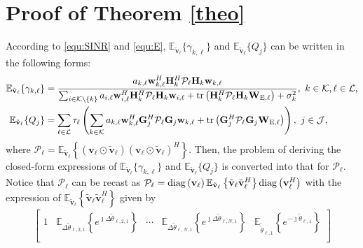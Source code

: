 \documentclass[12pt,draftclsnofoot, onecolumn]{IEEEtran}
\theoremstyle{plain}
\begin{document}
\begin{sloppypar}
\section{Proof of Theorem \ref{theo}} \label{Appen_A}
According to \eqref{equ:SINR} and \eqref{equ:E}, $\mathbb E_{\tilde{\mathbf v}_\ell}\{ \gamma_{k,\ell}\}$ and $\mathbb E_{\tilde{\mathbf v}_\ell}\{ Q_j\}$ can be written in the following forms: 
{\addtolength{\jot}{5pt}
	\begin{align}
	\mathbb E_{\tilde{\mathbf v}_\ell}\{ \gamma_{k,\ell}\} & = \frac{a_{k,\ell}\mathbf w_{k,\ell}^H\mathbf H_k^H\mathcal P_\ell\mathbf H_k\mathbf w_{k,\ell}}{\sum_{i\in \mathcal K\backslash\{k\}}a_{i,\ell}\mathbf w_{i,\ell}^H\mathbf H_k^H\mathcal P_\ell\mathbf H_k\mathbf w_{i,\ell} + {\rm tr}\left(\mathbf H_k^H\mathcal P_\ell\mathbf H_k\mathbf W_{\mathrm E,\ell}\right)+ \sigma_k^2}, \  k\in\mathcal K, \ell\in\mathcal L, \label{expecta_SINR_orig}\\ 
	\mathbb E_{\tilde{\mathbf v}_\ell}\{ Q_j\} & = \sum_{\ell\in\mathcal L}\tau_\ell\left(\sum_{k\in\mathcal K}a_{k,\ell}\mathbf w_{k,\ell}^H\mathbf G_j^H\mathcal P_\ell\mathbf G_j\mathbf w_{k,\ell} + {\rm tr}\left(\mathbf G_j^H\mathcal P_\ell\mathbf G_j\mathbf W_{\mathrm E, \ell} \right) \right), \  j\in\mathcal J, \label{expecta_E_orig}
	\end{align}}%
where $\mathcal P_\ell = \mathbb E_{\tilde{\mathbf v}_\ell}\left\lbrace \left(\mathbf v_\ell\odot\tilde {\mathbf v}_\ell\right)\left(\mathbf v_\ell\odot\tilde {\mathbf v}_\ell\right)^H \right\rbrace$. Then, the problem of deriving the closed-form expressions of $\mathbb E_{\tilde{\mathbf v}_\ell}\{ \gamma_{k,\ell}\}$ and $\mathbb E_{\tilde{\mathbf v}_\ell}\{ Q_j\}$ is converted into that for $\mathcal P_\ell$. Notice that $\mathcal P_\ell$ can be recast as $\mathcal P_\ell = {\rm diag}\left(\mathbf v_\ell\right)\mathbb E_{\tilde{\mathbf v}_\ell}\left\lbrace\tilde{\mathbf v}_\ell\tilde{\mathbf v}_{\ell}^H\right\rbrace {\rm diag}\left(\mathbf v_{\ell}^H\right)$ with the expression of $\mathbb E_{\tilde{\mathbf v}_\ell}\left\lbrace\tilde{\mathbf v}_\ell\tilde{\mathbf v}_{\ell}^H\right\rbrace$ given by
\begin{align}\label{equ:matrix}
\begin{bmatrix}
1& \mathbb E_{\Delta\tilde{\theta}_{\ell,2,1}}\left\lbrace e^{\jmath\Delta\tilde{\theta}_{\ell,2,1}}\right\rbrace & \cdots & \mathbb E_{\Delta\tilde{\theta}_{\ell,N,1}}\left\lbrace e^{\jmath\Delta\tilde{\theta}_{\ell,N,1}}\right\rbrace  & \mathbb E_{\tilde\tilde{\theta}_{\ell,1}}\left\lbrace e^{-\jmath\tilde{\theta}_{\ell,1}}\right\rbrace \\

\end{bmatrix}
\end{align}
\end{sloppypar}
\end{document}
